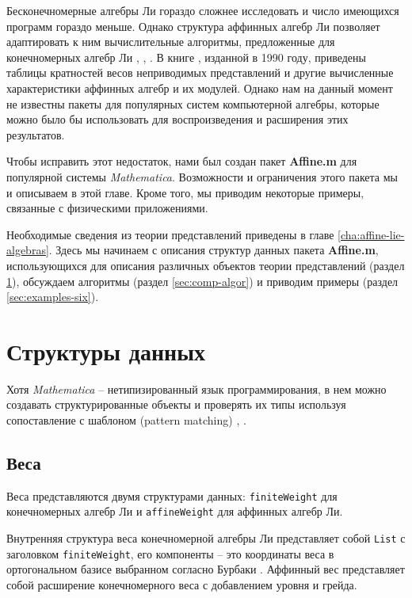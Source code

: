 Бесконечномерные алгебры Ли гораздо сложнее исследовать и число имеющихся программ гораздо меньше. 
Однако структура аффинных алгебр Ли позволяет адаптировать к ним вычислительные алгоритмы, предложенные для конечномерных алгебр Ли \cite{Fuchs:1996dd}, \cite{gannon2001algorithms}, \cite{kass1990ala}. В книге \cite{kass1990ala}, изданной в 1990 году, приведены таблицы кратностей весов неприводимых представлений и другие вычисленные характеристики аффинных алгебр и их модулей. Однако нам на данный момент не известны пакеты для популярных систем компьютерной алгебры, которые можно было бы использовать для воспроизведения и расширения этих результатов.

Чтобы исправить этот недостаток, нами был создан пакет {\bf Affine.m} для популярной системы  {\it Mathematica}. Возможности и ограничения этого пакета мы и описываем в этой главе. Кроме того, мы приводим некоторые примеры, связанные с физическими приложениями. 

Необходимые сведения из теории представлений приведены в главе \ref{cha:affine-lie-algebras}. Здесь мы начинаем с описания структур данных пакета  {\bf Affine.m}, использующихся для описания различных объектов теории представлений  (раздел \ref{sec:core-datastructures}), обсуждаем алгоритмы  (раздел \ref{sec:comp-algor}) и приводим примеры  (раздел \ref{sec:examples-six}). 

\section{Структуры данных}
\label{sec:core-datastructures} 
Хотя {\it Mathematica} -- нетипизированный язык программирования, в нем можно создавать структурированные объекты и проверять их типы используя сопоставление с шаблоном (pattern matching) \cite{shifrinmathematica}, \cite{maeder2000computer}.
\subsection{Веса}
\label{sec:weights}

Веса представляются двумя структурами данных: \lstinline{finiteWeight} для конечномерных алгебр Ли и \lstinline{affineWeight} для аффинных алгебр Ли.

Внутренняя структура веса конечномерной алгебры Ли представляет собой  \lstinline{List} с заголовком \lstinline{finiteWeight}, его компоненты -- это координаты веса в ортогональном базисе выбранном согласно Бурбаки \cite{bourbaki2002lie}.
Аффинный вес представляет собой расширение конечномерного веса с добавлением уровня и грейда. 

